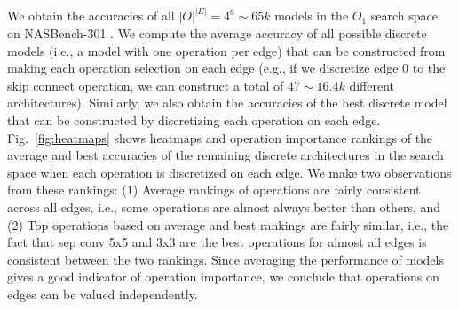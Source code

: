 \documentclass[onecolumn]{IEEEtran}
\begin{document}
 We obtain the accuracies of all \( |O|^{|E|} = 4^8 \sim 65k \) models in the \( O_1 \) search space on NASBench-301 \cite{Siems2020}. We compute the average accuracy of all possible discrete models (i.e., a model with one operation per edge) that can be constructed from making each operation selection on each edge (e.g., if we discretize edge 0 to the skip connect operation, we can construct a total of \( 47 \sim 16.4k \) different architectures). Similarly, we also obtain the accuracies of the best discrete model that can be constructed by discretizing each operation on each edge. Fig.~\ref{fig:heatmaps} shows heatmaps and operation importance rankings of the average and best accuracies of the remaining discrete architectures in the search space when each operation is discretized on each edge. We make two observations from these rankings: (1) Average rankings of operations are fairly consistent across all edges, i.e., some operations are almost always better than others, and (2) Top operations based on average and best rankings are fairly similar, i.e., the fact that sep conv 5x5 and 3x3 are the best operations for almost all edges is consistent between the two rankings. Since averaging the performance of models gives a good indicator of operation importance, we conclude that operations on edges can be valued independently.
\end{document}
